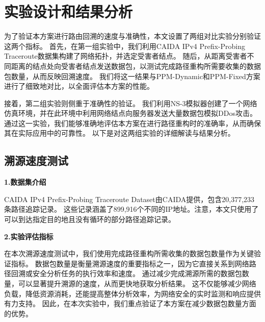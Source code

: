 
\section{实验设计和结果分析}
\label{sec:bib}
为了验证本方案进行路由回溯的速度与准确性，本文设置了两组对比实验分别验证这两个指标。
首先，在第一组实验中，我们利用CAIDA IPv4 Prefix-Probing Traceroute数据集构建了网络拓扑，并选定受害者结点。
随后，从距离受害者不同距离的结点处向受害者结点发送数据包，以测试完成路径重构所需要收集的数据包数量，从而反映回溯速度。
我们将这一结果与PPM-Dynamic和PPM-Fixed方案进行了细致地对比，以全面评估本方案的性能。\par

接着，第二组实验则侧重于准确性的验证。
我们利用NS-3模拟器创建了一个网络仿真环境，并在此环境中利用网络结点向服务器发送大量数据包模拟DDos攻击。
通过这一实验，我们能够准确地评估本方案在进行路径重构时的准确率，从而确保其在实际应用中的可靠性。
以下是对这两组实验的详细解读与结果分析。

\subsection{溯源速度测试}
\textbf{1.数据集介绍}\par
CAIDA IPv4 Prefix-Probing Traceroute Dataset由CAIDA提供，包含20,377,233条路径追踪记录。
这些记录涵盖了899,916个不同的IP地址。注意，本文只使用了可以到达指定目的地且没有循环的部分路径追踪记录。\par
\textbf{2.实验评估指标}\par
在本次溯源速度测试中，我们使用完成路径重构所需收集的数据包数量作为关键验证指标。
数据包数量是衡量溯源速度的重要指标之一，因为它直接关系到网络路径回溯或安全分析任务的执行效率和速度。
通过减少完成溯源所需的数据包数量，可以显著提升溯源的速度，从而更快地获取分析结果。
这不仅能够减少网络负载，降低资源消耗，还能提高整体分析效率，为网络安全的实时监测和响应提供有力支持。
因此，在本次实验中，我们重点验证了本方案在减少数据包数量方面的优势。\par

